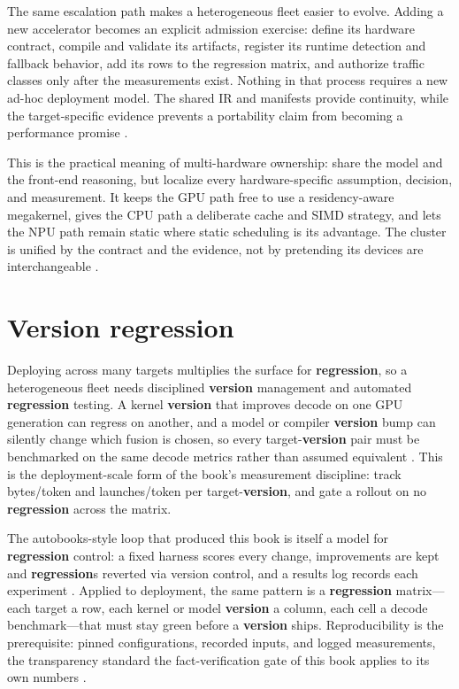 The same escalation path makes a heterogeneous fleet easier to evolve. Adding a new accelerator becomes an explicit admission exercise: define its hardware contract, compile and validate its artifacts, register its runtime detection and fallback behavior, add its rows to the regression matrix, and authorize traffic classes only after the measurements exist. Nothing in that process requires a new ad-hoc deployment model. The shared IR and manifests provide continuity, while the target-specific evidence prevents a portability claim from becoming a performance promise \citep{iree2024,lai2023relax,amd2024aie}.

This is the practical meaning of multi-hardware ownership: share the model and the front-end reasoning, but localize every hardware-specific assumption, decision, and measurement. It keeps the GPU path free to use a residency-aware megakernel, gives the CPU path a deliberate cache and SIMD strategy, and lets the NPU path remain static where static scheduling is its advantage. The cluster is unified by the contract and the evidence, not by pretending its devices are interchangeable \citep{yirage2026,rotem2018glow,amd2024xdna}.

\section{Version regression}
\label{sec:ch24_version_regression}

Deploying across many targets multiplies the surface for \textbf{regression}, so a heterogeneous fleet needs disciplined \textbf{version} management and automated \textbf{regression} testing. A kernel \textbf{version} that improves decode on one GPU generation can regress on another, and a model or compiler \textbf{version} bump can silently change which fusion is chosen, so every target-\textbf{version} pair must be benchmarked on the same decode metrics rather than assumed equivalent \citep{taxbreak2026,patel2025llminference}. This is the deployment-scale form of the book's measurement discipline: track bytes/token and launches/token per target-\textbf{version}, and gate a rollout on no \textbf{regression} across the matrix.

The autobooks-style loop that produced this book is itself a model for \textbf{regression} control: a fixed harness scores every change, improvements are kept and \textbf{regression}s reverted via version control, and a results log records each experiment \citep{yirage2026}. Applied to deployment, the same pattern is a \textbf{regression} matrix---each target a row, each kernel or model \textbf{version} a column, each cell a decode benchmark---that must stay green before a \textbf{version} ships. Reproducibility is the prerequisite: pinned configurations, recorded inputs, and logged measurements, the transparency standard the fact-verification gate of this book applies to its own numbers \citep{memoryfloor2026,dlbook}.

